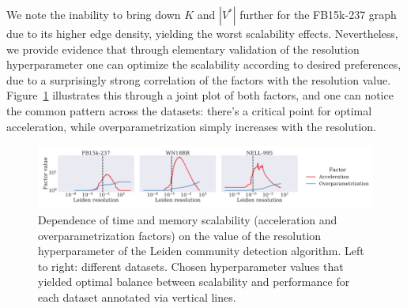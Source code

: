 We note the inability to bring down $K$ and $|V^*|$ further for the FB15k-237 graph due to its higher edge density, yielding the worst scalability effects. Nevertheless, we provide evidence that through elementary validation of the resolution hyperparameter one can optimize the scalability according to desired preferences, due to a surprisingly strong correlation of the factors with the resolution value. Figure~\ref{fig:scalability_resolution} illustrates this through a joint plot of both factors, and one can notice the common pattern across the datasets: there's a critical point for optimal acceleration, while overparametrization simply increases with the resolution.

\begin{figure}[H]
\begin{center}
\includegraphics[width=\textwidth]{figures/coins/scalability_leiden_resolution}
\end{center}
\caption[Dependence of time and memory scalability on the value of the resolution hyperparameter of the Leiden community detection algorithm.]{Dependence of time and memory scalability (acceleration and overparametrization factors) on the value of the resolution hyperparameter of the Leiden community detection algorithm. Left to right: different datasets. Chosen hyperparameter values that yielded optimal balance between scalability and performance for each dataset annotated via vertical lines.}
\label{fig:scalability_resolution}
\end{figure}




